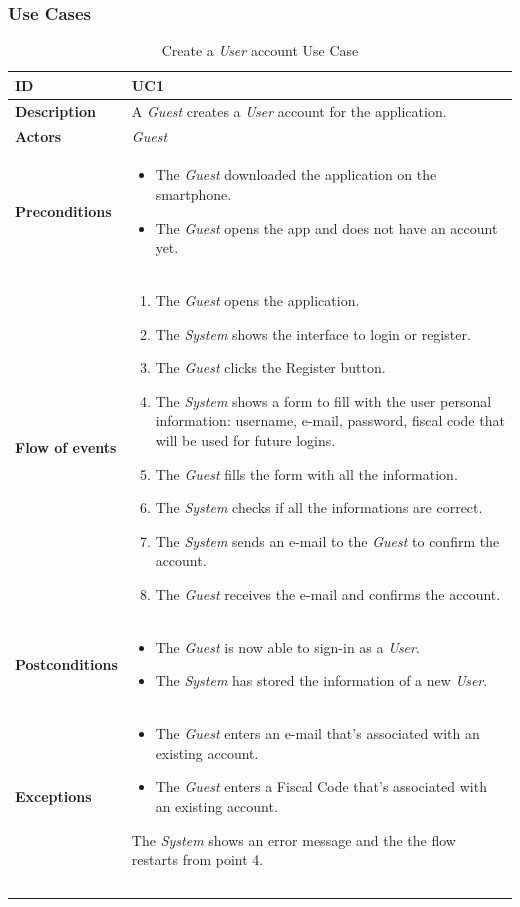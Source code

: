 \documentclass {article}
\begin{document}
	\subsubsection{Use Cases}
	
	\begin{longtable}{| p{3 cm} | p{10.5 cm} |} 
			\hline
			{\bf ID} & UC1 \\
			\hline
			{\bf Description} & A {\it Guest} creates a {\it User} account for the application.
			\\
			\hline
			{\bf Actors} & {\it Guest}\\
			\hline
			{\bf Preconditions} & 	
			\begin{itemize}
					\item The {\it Guest} downloaded the application on the smartphone.
					\item The {\it Guest} opens the app and does not have an account yet.
				\end{itemize}	
			\\
			\hline
			{\bf Flow of events} &	
			\begin{enumerate}
				\item The {\it Guest} opens the application.
				\item The {\it System} shows the interface to login or register.
				\item The {\it Guest} clicks the Register button.
				\item The {\it System} shows a form to fill with the user personal information: username, e-mail, password, fiscal code that will be used for future logins.
				\item The {\it Guest} fills the form with all the information.
				\item The {\it System} checks if all the informations are correct.
				\item The {\it System} sends an e-mail to the {\it Guest} to confirm the account.
				\item The {\it Guest} receives the e-mail and confirms the account.
			\end{enumerate}
			\\
			\hline
			{\bf Postconditions} & 
			\begin{itemize}
				\item The {\it Guest} is now able to sign-in as a {\it User}.
				\item The {\it System} has stored the information of a new {\it User}.
			\end{itemize}
			\\
			\hline
			{\bf Exceptions} & 	
			\begin{itemize}
				\item The {\it Guest} enters an e-mail that's associated with an existing account.
				\item The {\it Guest} enters a Fiscal Code that's associated with an existing account. 
			\end{itemize}
			The {\it System} shows an error message and the the flow restarts from point 4.
			\\ \\
			\hline
			\caption{Create a {\it User} account Use Case}
			\end{longtable}
\end{document}
